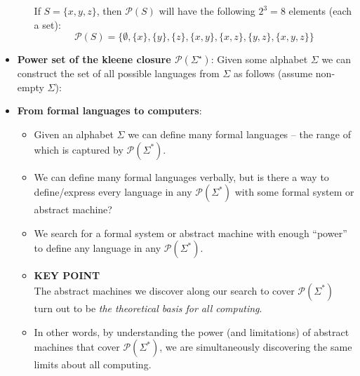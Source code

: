 \documentclass{report}
\begin{document}
\begin{itemize}
\begin{itemize}
                    If $S = \{x, y, z\}$, then $\mathcal{P}(S)$ will have the following $2^3 = 8$ elements (each a set):
                    \[
                        \mathcal{P}(S) = \{\emptyset, \{x\}, \{y\}, \{z\}, \{x, y\}, \{x, z\}, \{y, z\}, \{x, y, z\}\}
                    \]
            \end{itemize}
        \item \textbf{Power set of the kleene closure $\mathcal{P}(\Sigma^{\star}) $}: Given some alphabet $\Sigma$ we can construct the set of all possible languages from $\Sigma$ as follows (assume non-empty $\Sigma$):
            \bigbreak \noindent 
        \item \textbf{From formal languages to computers}:
            \begin{itemize}
                \item Given an alphabet $\Sigma$ we can define many formal languages – the range of which is captured by $\mathcal{P}(\Sigma^*)$.

                \item We can define many formal languages verbally, but is there a way to define/express every language in any $\mathcal{P}(\Sigma^*)$ with some formal system or abstract machine?

                \item We search for a formal system or abstract machine with enough “power” to define any language in any $\mathcal{P}(\Sigma^*)$.

                \item \textbf{KEY POINT} \\
                    The abstract machines we discover along our search to cover $\mathcal{P}(\Sigma^*)$ turn out to be \textit{the theoretical basis for all computing}.

                \item In other words, by understanding the power (and limitations) of abstract machines that cover $\mathcal{P}(\Sigma^*)$, we are simultaneously discovering the same limits about all computing.
            \end{itemize}
    \end{itemize}

    \pagebreak 
\end{document}

